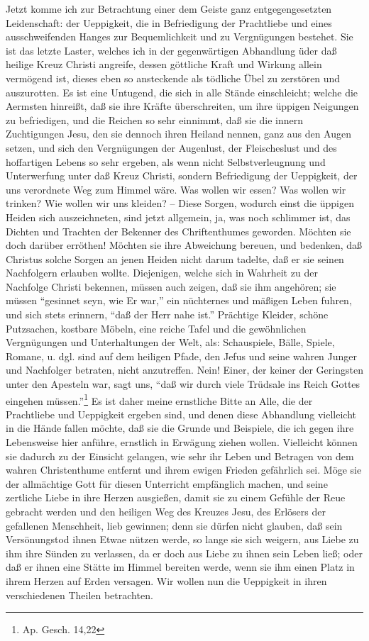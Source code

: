 Jetzt komme ich zur Betrachtung einer dem Geiste ganz entgegengesetzten
Leidenschaft: der Ueppigkeit, die in Befriedigung der Prachtliebe und eines
ausschweifenden Hanges zur Bequemlichkeit und zu Vergnügungen bestehet. Sie ist
das letzte Laster, welches ich in der gegenwärtigen Abhandlung üder daß heilige
Kreuz Christi angreife, dessen göttliche Kraft und Wirkung allein vermögend ist,
dieses eben so ansteckende als tödliche Übel zu zerstören und auszurotten. Es
ist eine Untugend, die sich in alle Stände einschleicht; welche die Aermsten
hinreißt, daß sie ihre Kräfte überschreiten, um ihre üppigen Neigungen zu
befriedigen, und die Reichen so sehr einnimmt, daß sie die innern Zuchtigungen
Jesu, den sie dennoch ihren Heiland nennen, ganz aus den Augen setzen, und sich
den Vergnügungen der Augenlust, der Fleischeslust und des hoffartigen Lebens so
sehr ergeben, als wenn nicht Selbstverleugnung und Unterwerfung unter daß Kreuz
Christi, sondern Befriedigung der Ueppigkeit, der uns verordnete Weg zum Himmel
wäre. Was wollen wir essen? Was wollen wir trinken? Wie wollen wir uns kleiden?
-- Diese Sorgen, wodurch einst die üppigen Heiden sich auszeichneten, sind jetzt
allgemein, ja, was noch schlimmer ist, das Dichten und Trachten der Bekenner des
Chriftenthumes geworden. Möchten sie doch darüber erröthen! Möchten sie ihre
Abweichung bereuen, und bedenken, daß Christus solche Sorgen an jenen Heiden
nicht darum tadelte, daß er sie seinen Nachfolgern erlauben wollte. Diejenigen,
welche sich in Wahrheit zu der Nachfolge Christi bekennen, müssen auch zeigen,
daß sie ihm angehören; sie müssen "`gesinnet seyn, wie Er war,"' ein nüchternes
und mäßigen Leben fuhren, und sich stets erinnern, "`daß der Herr nahe ist."'
Prächtige Kleider, schöne Putzsachen, kostbare Möbeln, eine reiche Tafel und die
gewöhnlichen Vergnügungen und Unterhaltungen der Welt, als: Schauspiele, Bälle,
Spiele, Romane, u. dgl. sind auf dem heiligen Pfade, den Jefus und seine wahren
Junger und Nachfolger betraten, nicht anzutreffen. Nein! Einer, der keiner der
Geringsten unter den Apesteln war, sagt uns, "`daß wir durch viele Trüdsale ins
Reich Gottes eingehen müssen."'\footnote{Ap. Gesch. 14,22} Es ist daher meine
ernstliche Bitte an Alle, die der Prachtliebe und Ueppigkeit ergeben sind, und
denen diese Abhandlung vielleicht in die Hände fallen möchte, daß sie die Grunde
und Beispiele, die ich gegen ihre Lebensweise hier anführe, ernstlich in
Erwägung ziehen wollen. Vielleicht können sie dadurch zu der Einsicht gelangen,
wie sehr ihr Leben und Betragen von dem wahren Christenthume entfernt und ihrem
ewigen Frieden gefährlich sei. Möge sie der allmächtige Gott für diesen
Unterricht empfänglich machen, und seine zertliche Liebe in ihre Herzen
ausgießen, damit sie zu einem Gefühle der Reue gebracht werden und den heiligen
Weg des Kreuzes Jesu, des Erlösers der gefallenen Menschheit, lieb gewinnen;
denn sie dürfen nicht glauben, daß sein Versönungstod ihnen Etwae nützen werde,
so lange sie sich weigern, aus Liebe zu ihm ihre Sünden zu verlassen, da er doch
aus Liebe zu ihnen sein Leben ließ; oder daß er ihnen eine Stätte im Himmel
bereiten werde, wenn sie ihm einen Platz in ihrem Herzen auf Erden versagen. Wir
wollen nun die Ueppigkeit in ihren verschiedenen Theilen betrachten.

